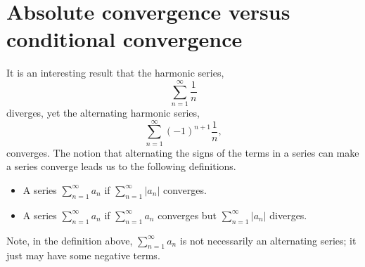 \documentclass{ximera}
\begin{document}
\section{Absolute convergence versus conditional convergence}


It is an interesting result that the harmonic series,
\[
\sum_{n=1}^\infty \frac1n
\]
diverges, yet the alternating harmonic series,
\[
\sum_{n=1}^\infty (-1)^{n+1}\frac1n,
\]
converges. The notion that alternating the signs of the terms in a
series can make a series converge leads us to the following
definitions.

\begin{definition}\hfil
\begin{itemize}
\item A series $\sum_{n=1}^\infty a_n$  if $\sum_{n=1}^\infty |a_n|$ converges.
\item A series $\sum_{n=1}^\infty a_n$  if $\sum_{n=1}^\infty a_n$ converges but $\sum_{n=1}^\infty |a_n|$ diverges.
\end{itemize}
\end{definition}

Note, in the definition above, $\sum_{n=1}^\infty a_n$ is not
necessarily an alternating series; it just may have some negative
terms.
\end{document}
